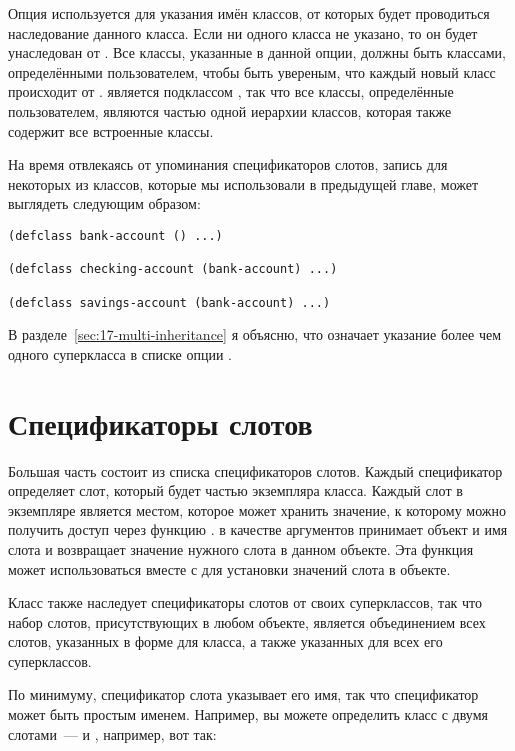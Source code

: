 Опция  используется для указания имён классов, от которых
будет проводиться наследование данного класса.  Если ни одного класса не указано, то он
будет унаследован от .  Все классы, указанные в данной опции, должны
быть классами, определёнными пользователем, чтобы быть увереным, что каждый новый класс
происходит от .   является подклассом
, так что все классы, определённые пользователем, являются частью одной иерархии
классов, которая также содержит все встроенные классы.

На время отвлекаясь от упоминания спецификаторов слотов, запись  для
некоторых из классов, которые мы использовали в предыдущей главе, может выглядеть
следующим образом:

\begin{lstlisting}
(defclass bank-account () ...)

(defclass checking-account (bank-account) ...)

(defclass savings-account (bank-account) ...)
\end{lstlisting}

В разделе~\ref{sec:17-multi-inheritance} я объясню, что означает указание более чем одного
суперкласса в списке опции .

\section{Спецификаторы слотов}

Большая часть  состоит из списка спецификаторов слотов.  Каждый
спецификатор определяет слот, который будет частью экземпляра класса.  Каждый слот в
экземпляре является местом, которое может хранить значение, к которому можно получить
доступ через функцию .  в качестве аргументов принимает
объект и имя слота и возвращает значение нужного слота в данном объекте.  Эта функция
может использоваться вместе с  для установки значений слота в объекте.

Класс также наследует спецификаторы слотов от своих суперклассов, так что набор слотов,
присутствующих в любом объекте, является объединением всех слотов, указанных в форме
 для класса, а также указанных для всех его суперклассов.

По минимуму, спецификатор слота указывает его имя, так что спецификатор может быть простым
именем.  Например, вы можете определить класс  с двумя слотами~---
 и , например, вот так:

